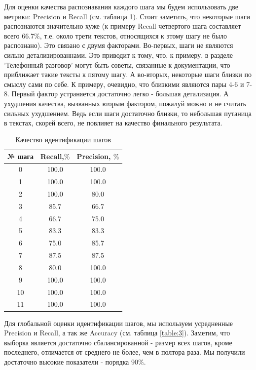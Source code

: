\documentclass[12pt]{article}
\begin{document}
Для оценки качества распознавания каждого шага мы будем использовать две метрики: Precision и Recall (см. таблица \ref{table:2}). Стоит заметить, что некоторые шаги распознаются значительно хуже (к примеру Recall четвертого шага составляет всего 66.7$\%$, т.е. около трети текстов, относящихся к этому шагу не было распознано). Это связано с двумя факторами. Во-первых, шаги не являются сильно детализированнами. Это приводит к тому, что, к примеру, в разделе 'Телефонный разговор' могут быть советы, связанные к документации, что приближает такие тексты к пятому шагу. А во-вторых, некоторые шаги близки по смыслу сами по себе. К примеру, очевидно, что близкими являются пары 4-6 и 7-8.  Первый фактор устраняется достаточно легко - большая детализация. А ухудшения качества, вызванных вторым фактором, пожалуй можно и не считать сильных ухудшением. Ведь если шаги достаточно близки, то небольшая путаница в текстах, скорей всего, не повлияет на качество финального результата.

\begin{table}[h!]
\centering
\begin{tabular}{||c|c|c||} 
 \hline
 № шага & Recall,$\%$ & Precision, $\%$\\
 \hline
 0&   100.0&  100.0\\ 
 1&   100.0&  100.0  \\ 
 2&   100.0&  80.0  \\ 
 3&   85.7&66.7  \\ 
 4&   66.7&  75.0\\ 
 5&   83.3&83.3  \\ 
 6&   75.0&85.7  \\ 
 7&   87.5& 87.5  \\ 
 8&   80.0&100.0  \\ 
 9&   100.0&  100.0  \\ 
 10&   100.0&  100.0  \\ 
 11&   100.0&  100.0  \\ 
 \hline
\end{tabular}
\caption{Качество идентификации шагов}
\label{table:2}
\end{table}

Для глобальной оценки идентификации шагов, мы используем усредненные Precision и Recall, а так же Accuracy (см. таблица \ref{table:3}). Заметим, что выборка является достаточно сбалансированной - размер всех шагов, кроме последнего, отличается от среднего не более, чем в полтора раза. Мы получили достаточно высокие показатели - порядка 90$\%$.
\end{document}

